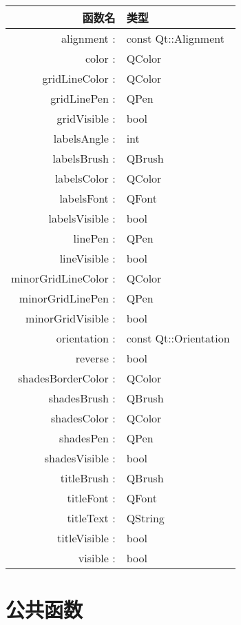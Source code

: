 \begin{longtable}[l]{|r|l|}
\hline
函数名 & 类型 \\
\hline
alignment :&	const Qt::Alignment\\
\hline
color :&	QColor\\
\hline
gridLineColor :&	QColor\\
\hline
gridLinePen :&	QPen\\
\hline
gridVisible :&	bool\\
\hline
labelsAngle :&	int\\
\hline
labelsBrush :&	QBrush\\
\hline
labelsColor :&	QColor\\
\hline
labelsFont :&	QFont\\
\hline
labelsVisible :&	bool\\
\hline
linePen :&	QPen\\
\hline
lineVisible :&	bool\\
\hline
minorGridLineColor :&	QColor\\
\hline
minorGridLinePen :&	QPen\\
\hline
minorGridVisible :&	bool\\
\hline
orientation :&	const Qt::Orientation\\
\hline
reverse :&	bool\\
\hline
shadesBorderColor :&	QColor\\
\hline
shadesBrush :&	QBrush\\
\hline
shadesColor :&	QColor\\
\hline
shadesPen :&	QPen\\
\hline
shadesVisible :&	bool\\
\hline
titleBrush :&	QBrush\\
\hline
titleFont :&	QFont\\
\hline
titleText :&	QString\\
\hline
titleVisible :&	bool\\
\hline
visible :&	bool\\
\hline
\end{longtable}

\section{公共函数}

